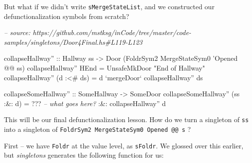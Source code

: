 \documentclass[]{article}
\newenvironment{Shaded}{}{}
\newcommand{\CommentTok}[1]{\textcolor[rgb]{0.38,0.63,0.69}{\textit{#1}}}
\newcommand{\DataTypeTok}[1]{\textcolor[rgb]{0.56,0.13,0.00}{#1}}
\newcommand{\FunctionTok}[1]{\textcolor[rgb]{0.02,0.16,0.49}{#1}}
\newcommand{\NormalTok}[1]{#1}
\newcommand{\OtherTok}[1]{\textcolor[rgb]{0.00,0.44,0.13}{#1}}
\newcommand{\StringTok}[1]{\textcolor[rgb]{0.25,0.44,0.63}{#1}}
\begin{document}
But what if we didn't write \texttt{sMergeStateList}, and we constructed our
defunctionalization symbols from scratch?

\begin{Shaded}
\begin{Highlighting}[]
\CommentTok{-- source: https://github.com/mstksg/inCode/tree/master/code-samples/singletons/Door4Final.hs#L119-L123}

\NormalTok{collapseHallway''}
\OtherTok{    ::} \DataTypeTok{Hallway}\NormalTok{ ss}
    \OtherTok{->} \DataTypeTok{Door}\NormalTok{ (}\DataTypeTok{FoldrSym2} \DataTypeTok{MergeStateSym0}\NormalTok{ '}\DataTypeTok{Opened} \FunctionTok{@@}\NormalTok{ ss)}
\NormalTok{collapseHallway'' }\DataTypeTok{HEnd}       \FunctionTok{=} \DataTypeTok{UnsafeMkDoor} \StringTok{"End of Hallway"}
\NormalTok{collapseHallway'' (d }\FunctionTok{:<#}\NormalTok{ ds) }\FunctionTok{=}\NormalTok{ d }\OtherTok{`mergeDoor`}\NormalTok{ collapseHallway'' ds}

\OtherTok{collapseSomeHallway'' ::} \DataTypeTok{SomeHallway} \OtherTok{->} \DataTypeTok{SomeDoor}
\NormalTok{collapseSomeHallway'' (ss }\FunctionTok{:&:}\NormalTok{ d) }\FunctionTok{=} \FunctionTok{???}    \CommentTok{-- what goes here?}
                               \FunctionTok{:&:}\NormalTok{ collapseHallway'' d}
\end{Highlighting}
\end{Shaded}

This will be our final defunctionalization lesson. How do we turn a singleton of
\texttt{ss} into a singleton of
\texttt{FoldrSym2\ MergeStateSym0\ \textquotesingle{}Opened\ @@\ s} ?

First -- we have \texttt{Foldr} at the value level, as \texttt{sFoldr}. We
glossed over this earlier, but \emph{singletons} generates the following
function for us:
\end{document}

